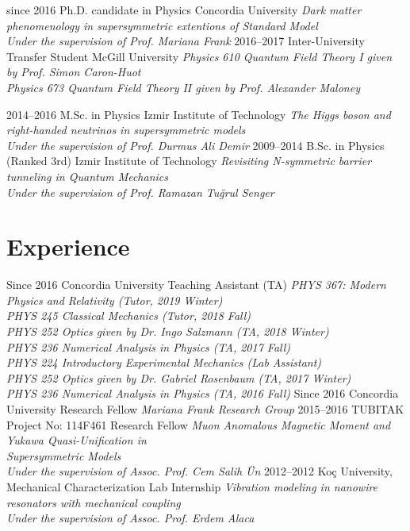 \documentclass[]{friggeri-cv}
\begin{document}
\begin{entrylist}
  \entry
    {since 2016}
    {Ph.D. candidate in Physics}
    {Concordia University}
    {\emph{Dark matter phenomenology in supersymmetric extentions of Standard Model \\
    		Under the supervision of Prof. Mariana Frank}}
   \entry
   {2016--2017}
   {Inter-University Transfer Student}
   {McGill University}
   {\emph{Physics 610 Quantum Field Theory I given by Prof. Simon Caron-Huot \\
      Physics 673 Quantum Field Theory II given by Prof. Alexander Maloney }}
   
	
   
  \entry
    {2014–2016}
    {M.Sc. in Physics}
    {Izmir Institute of Technology}
    {\emph{The Higgs boson and right-handed neutrinos in supersymmetric models \\
    		Under the supervision of Prof. Durmus Ali Demir}}
  \entry
    {2009–2014}
    {B.Sc. in Physics (Ranked 3rd)}
    {Izmir Institute of Technology}
    {\emph{Revisiting N-symmetric barrier tunneling in Quantum Mechanics \\
		   Under the supervision of Prof. Ramazan Tuğrul Senger	
    }}
    

\end{entrylist}

\section{Experience}

\begin{entrylist}
  \entry
    {Since 2016}
    {Concordia University}
    {Teaching Assistant (TA)}
    {\emph{PHYS 367: Modern Physics and Relativity (Tutor, 2019 Winter) \\
    PHYS 245 Classical Mechanics (Tutor, 2018 Fall) \\
    PHYS 252 Optics given by Dr. Ingo Salzmann (TA, 2018 Winter) \\ 
	PHYS 236 Numerical Analysis in Physics (TA, 2017 Fall) \\
	PHYS 224 Introductory Experimental Mechanics (Lab Assistant) \\
	PHYS 252 Optics given by Dr. Gabriel Rosenbaum (TA, 2017 Winter) \\
	PHYS 236 Numerical Analysis in Physics (TA, 2016 Fall)
	}}
  \entry
    {Since 2016}
    {Concordia University}
    {Research Fellow}
    {\emph{Mariana Frank Research Group}}
  \entry
    {2015--2016}
    {TUBITAK Project No: 114F461}
    {Research Fellow}
    {\emph{Muon Anomalous Magnetic Moment and Yukawa Quasi-Unification in \\ Supersymmetric Models \\
    		Under the supervision of Assoc. Prof. Cem Salih Ün}}  
  \entry
  	{2012--2012}
  	{Koç University, Mechanical Characterization Lab}
  	{Internship}
  	{\emph{Vibration modeling in nanowire resonators with mechanical coupling \\
  	 Under the supervision of Assoc. Prof. Erdem Alaca}}  
\end{entrylist}
\end{document}
